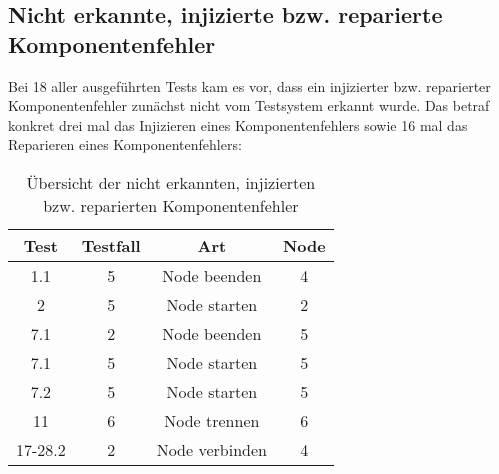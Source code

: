 \subsection{Nicht erkannte, injizierte bzw. reparierte Komponentenfehler}
\label{subsec:notDetectedFaults}

Bei 18 aller ausgeführten \glspl{Test} kam es vor, dass ein injizierter bzw. reparierter Komponentenfehler zunächst nicht vom Testsystem erkannt wurde.
Das betraf konkret drei mal das Injizieren eines Komponentenfehlers sowie 16 mal das Reparieren eines Komponentenfehlers:

\begin{table}[h]
    \begin{tabular}{c|ccc}
    	 \gls{Test}   & \gls{Testfall} &      Art       & Node \\ \hline
    	  1.1   &    5     &  Node beenden  &  4   \\
    	   2    &    5     &  Node starten  &  2   \\
    	  7.1   &    2     &  Node beenden  &  5   \\
    	  7.1   &    5     &  Node starten  &  5   \\
    	  7.2   &    5     &  Node starten  &  5   \\
    	  11    &    6     &  Node trennen  &  6   \\
    	17-28.2 &    2     & Node verbinden &  4
    \end{tabular} 
    \caption[Übersicht der nicht erkannten, injizierten/reparierten Komponentenfehler]
    {Übersicht der nicht erkannten, injizierten bzw. reparierten Komponentenfehler}
    \label{tab:notDetectedFaults}
\end{table}

